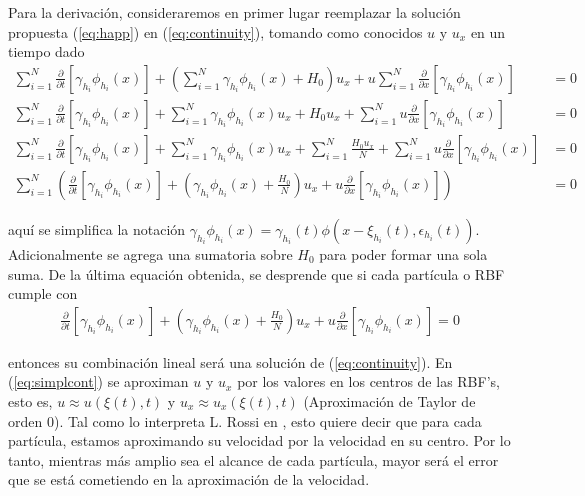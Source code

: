 \documentclass[spanish]{article}
\begin{document}
 	Para la derivación, consideraremos en primer lugar reemplazar la solución propuesta (\ref{eq:happ}) en (\ref{eq:continuity}), tomando como conocidos $u$ y $u_x$ en un tiempo dado
 	\begin{align*}
 	\sum_{i=1}^{N} \frac{\partial}{\partial t}[\gamma_{h_i}\phi_{h_i}(x)] + \left(\sum_{i=1}^{N} \gamma_{h_i} \phi_{h_i}(x) + H_0\right) u_x + u \sum_{i=1}^N \frac{\partial}{\partial x}[\gamma_{h_i}\phi_{h_i}(x)] & = 0 \\
 	\sum_{i=1}^{N} \frac{\partial}{\partial t}[\gamma_{h_i}\phi_{h_i}(x)] + \sum_{i=1}^{N} \gamma_{h_i} \phi_{h_i}(x)u_x + H_0 u_x +  \sum_{i=1}^N u \frac{\partial}{\partial x}[\gamma_{h_i}\phi_{h_i}(x)] & = 0 \\
 	\sum_{i=1}^{N} \frac{\partial}{\partial t}[\gamma_{h_i}\phi_{h_i}(x)] + \sum_{i=1}^{N} \gamma_{h_i} \phi_{h_i}(x)u_x + \sum_{i=1}^{N} \frac{H_0 u_x}{N} +  \sum_{i=1}^N u \frac{\partial}{\partial x}[\gamma_{h_i}\phi_{h_i}(x)] & = 0 \\
 	\sum_{i=1}^N \left(\frac{\partial}{\partial t}[\gamma_{h_i}\phi_{h_i}(x)] + \left(\gamma_{h_i} \phi_{h_i}(x) + \frac{H_0}{N}\right)u_x + u \frac{\partial}{\partial x}[\gamma_{h_i}\phi_{h_i}(x)]\right) & = 0
 	\end{align*}

 	\noindent aquí se simplifica la notación $\displaystyle \gamma_{h_i}\phi_{h_i}(x) = \gamma_{h_i}(t)\phi(x-\xi_{h_i}(t),\epsilon_{h_i}(t))$. Adicionalmente se agrega una sumatoria sobre $H_0$ para poder formar una sola suma. De la última equación obtenida, se desprende que si cada partícula o RBF cumple con
 	\begin{align}
 	 	\frac{\partial}{\partial t}[\gamma_{h_i}\phi_{h_i}(x)] + \left(\gamma_{h_i} \phi_{h_i}(x) + \frac{H_0}{N}\right)u_x + u \frac{\partial}{\partial x}[\gamma_{h_i}\phi_{h_i}(x)] = 0
 	 	\label{eq:simplcont}
 	 \end{align}

 	 \noindent entonces su combinación lineal será una solución de (\ref{eq:continuity}). En (\ref{eq:simplcont}) se aproximan $u$ y $u_x$ por los valores en los centros de las RBF's, esto es, $u \approx u(\xi(t),t)$ y $u_x \approx u_x(\xi(t),t)$ (Aproximación de Taylor de orden $0$). Tal como lo interpreta L. Rossi en \cite{rossi}, esto quiere decir que para cada partícula, estamos aproximando su velocidad por la velocidad en su centro. Por lo tanto, mientras más amplio sea el alcance de cada partícula, mayor será el error que se está cometiendo en la aproximación de la velocidad. 
\end{document}
